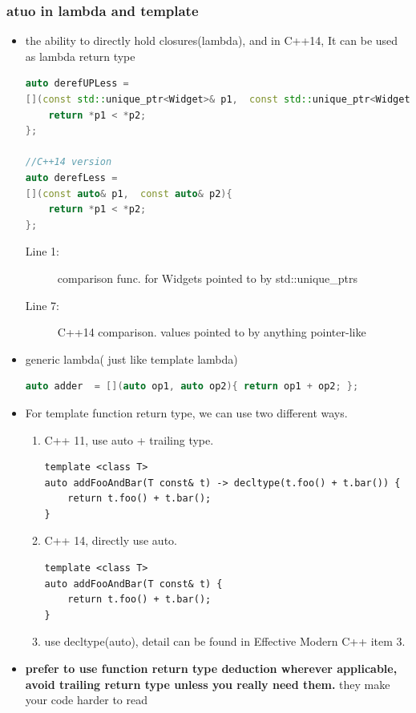 \documentclass[a4paper,11pt,twoside]{book}
\begin{document}
\subsubsection{atuo in lambda and template}
\begin{itemize}
	\item the ability to directly hold closures(lambda), and in C++14, It can be used as lambda return type
\begin{lstlisting}[frame=single, language=c++]
auto derefUPLess =               
[](const std::unique_ptr<Widget>& p1,  const std::unique_ptr<Widget>& p2){
	return *p1 < *p2; 
};                 
	
//C++14 version
auto derefLess = 
[](const auto& p1,  const auto& p2){
	return *p1 < *p2; 
}; 
\end{lstlisting}
\begin{description}
	\item[Line 1:] comparison func. for Widgets pointed to by std::unique\_ptrs
	\item[Line 7:] C++14 comparison. values pointed to by anything pointer-like
\end{description}

		\item generic lambda( just like template lambda)
\begin{lstlisting}[frame=single, language=c++]
auto adder  = [](auto op1, auto op2){ return op1 + op2; };
\end{lstlisting}
	
\item For template function return type, we can use two different ways.

\begin{enumerate}
	\item C++ 11, use auto + trailing type.
\begin{lstlisting}[numbers=none]
template <class T>
auto addFooAndBar(T const& t) -> decltype(t.foo() + t.bar()) {
	return t.foo() + t.bar();
}
\end{lstlisting}
	\item C++ 14, directly use auto.
\begin{lstlisting}[numbers=none]
template <class T>
auto addFooAndBar(T const& t) {
	return t.foo() + t.bar();
}
\end{lstlisting}
	\item use decltype(auto), detail can be found in Effective Modern C++ item 3.
\end{enumerate}
	
	\item \textbf{prefer to use function return type deduction wherever applicable, avoid trailing return type unless you really need them.} they make your code harder to read
	
\end{itemize}
\end{document}
